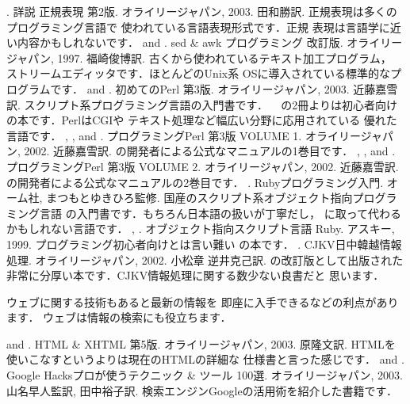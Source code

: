 \begin{myreferences}
. \newblock
詳説 正規表現 第2版.
オライリージャパン, 2003.
田和勝訳.
\sanko
正規表現は多くのプログラミング言語で
使われている言語表現形式です．正規
表現は言語学に近い内容かもしれないです．
%
 and . \newblock
 sed \& awk プログラミング 改訂版.
 オライリージャパン, 1997.
 福崎俊博訳.
\sanko
古くから使われているテキスト加工プログラム，
ストリームエディッタです．ほとんどのUnix系
OSに導入されている標準的なプログラムです．
%
 and . \newblock
 初めてのPerl 第3版.
 オライリージャパン, 2003.
 近藤嘉雪訳.
\sanko
スクリプト系プログラミング言語の入門書です．
~\cite{Programming_Perl3vol1,Programming_perl3vol2}
の2冊よりは初心者向けの本です．PerlはCGIや
テキスト処理など幅広い分野に応用されている
優れた言語です．
%
, , and 
  . \newblock
 プログラミングPerl 第3版 VOLUME 1.
 オライリージャパン, 2002.
 近藤嘉雪訳.
\sanko
{}の開発者による公式なマニュアルの1巻目です．
%
, , and 
   . \newblock
 プログラミングPerl 第3版 VOLUME 2.
 オライリージャパン, 2002.
 近藤嘉雪訳.\sanko
{}の開発者による公式なマニュアルの2巻目です．
%
. \newblock
Rubyプログラミング入門.
オーム社, まつもとゆきひろ監修.\sanko
国産のスクリプト系オブジェクト指向プログラミング言語
の入門書です．もちろん日本語の扱いが丁寧だし，
に取って代わるかもしれない言語です．
%
, . \newblock
オブジェクト指向スクリプト言語 Ruby.
アスキー, 1999.\sanko
プログラミング初心者向けとは言い難い
の本です．
%
. \newblock
CJKV日中韓越情報処理.
オライリージャパン, 2002.
小松章 逆井克己訳.\sanko
{}の改訂版として出版された
非常に分厚い本です．CJKV情報処理に関する数少ない良書だと
思います．
\end{myreferences}

ウェブに関する技術もあると最新の情報を
即座に入手できるなどの利点があります．
ウェブは情報の検索にも役立ちます．
\begin{myreferences}
 and . \newblock
HTML \& XHTML 第5版.
オライリージャパン, 2003.
原隆文訳.\sanko
HTMLを使いこなすというよりは現在のHTMLの詳細な
仕様書と言った感じです．
%
 and . \newblock
Google Hacks\zdash プロが使うテクニック \& ツール 100選.
オライリージャパン, 2003.
山名早人監訳, 田中裕子訳.\sanko
検索エンジンGoogleの活用術を紹介した書籍です．
\end{myreferences}

